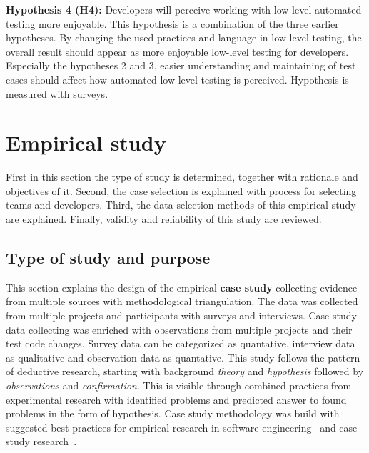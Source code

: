     \begin{addmargin}[0em]{0em}
    \vspace{10px}
    \textbf{Hypothesis 4 (H4):} Developers will perceive working with low-level automated testing more enjoyable.
    \vspace{5px}
    \newline
    This hypothesis is a combination of the three earlier hypotheses. By changing the used practices and language in low-level testing,
    the overall result should appear as more enjoyable low-level testing for developers. Especially the hypotheses 2 and 3, easier understanding
    and maintaining of test cases should affect how automated low-level testing is perceived.
    Hypothesis is measured with surveys.
    \end{addmargin}

\section{Empirical study}
First in this section the type of study is determined, together with rationale and objectives of it. Second, the case selection
is explained with process for selecting teams and developers. Third, the data selection methods of this empirical study are
explained. Finally, validity and reliability of this study are reviewed.

\subsection{Type of study and purpose}
    This section explains the design of the empirical \textbf{case study} collecting evidence from multiple sources with methodological triangulation.
    The data was collected from multiple projects and participants with surveys and interviews.
    Case study data collecting was enriched with observations from
    multiple projects and their test code changes. Survey data can be categorized as quantative, interview data as qualitative and observation data as quantative.
    This study follows the pattern of deductive research, starting with background \textit{theory} and \textit{hypothesis} followed by
    \textit{observations} and \textit{confirmation}. This is visible through combined practices
    from experimental research with identified problems and predicted answer to found problems in the form of hypothesis.
    Case study methodology was build with suggested best practices for empirical research in software engineering~\cite{kitchenham2002preliminary} and case
    study research~\cite{runeson2012case}.

